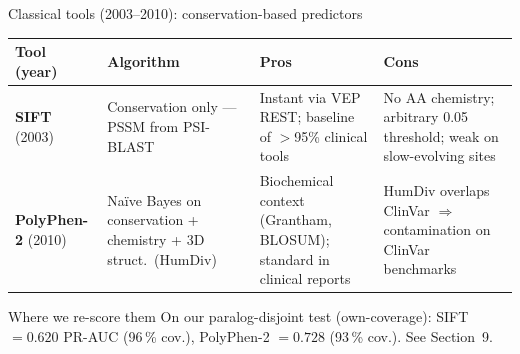 \documentclass[aspectratio=169,10pt]{beamer}
\begin{document}
\begin{frame}{Classical tools (2003--2010): conservation-based predictors}
  \footnotesize
  \begin{tabular}{@{} p{1.7cm} p{2.7cm} p{2.9cm} p{2.9cm} @{}}
    \toprule
    \textbf{Tool (year)} & \textbf{Algorithm} & \textbf{\textcolor{green!40!black}{Pros}} & \textbf{\textcolor{red!70!black}{Cons}} \\
    \midrule
    \textbf{SIFT} (2003) &
    Conservation only --- PSSM from PSI-BLAST &
    Instant via VEP REST; baseline of $>$95\% clinical tools &
    No AA chemistry; arbitrary 0.05 threshold; weak on slow-evolving sites \\
    \midrule
    \textbf{PolyPhen-2} (2010) &
    Naïve Bayes on conservation + chemistry + 3D struct.\ (HumDiv) &
    Biochemical context (Grantham, BLOSUM); standard in clinical reports &
    \alert{HumDiv overlaps ClinVar} $\Rightarrow$ contamination on ClinVar benchmarks \\
    \bottomrule
  \end{tabular}

  \vspace{0.6em}
  \begin{exampleblock}{Where we re-score them}
    On our paralog-disjoint test (own-coverage):
    SIFT $= 0.620$ PR-AUC (96\,\% cov.), PolyPhen-2 $= 0.728$ (93\,\% cov.). See Section~9.
  \end{exampleblock}
\end{frame}
\end{document}
